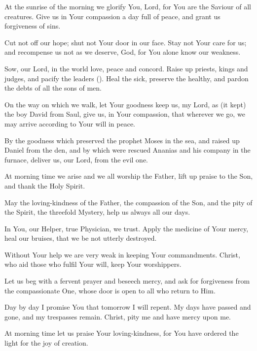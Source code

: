 \documentclass[12pt,twoside,a5paper]{article}
\begin{document}


\label{at-the-sunrise}


\begin{halfparskip}
  At the sunrise of the morning we glorify You, Lord, for You are the Saviour of all creatures. Give us in Your compassion a day full of peace, and grant us forgiveness of sins.

  Cut not off our hope; shut not Your door in our face. Stay not Your care for us; and recompense us not as we deserve, God, for You alone know our weakness.

  Sow, our Lord, in the world love, peace and concord. Raise up priests, kings and judges, and pacify the leaders (). Heal the sick, preserve the healthy, and pardon the debts of all the sons of men.

  On the way on which we walk, let Your goodness keep us, my Lord, as (it kept) the boy David from Saul, give us, in Your compassion, that wherever we go, we may arrive according to Your will in peace.

  By the goodness which preserved the prophet Moses in the sea, and raised up Daniel from the den, and by which were rescued Ananias and his company in the furnace, deliver us, our Lord, from the evil one.
\end{halfparskip}

\begin{halfparskip}
   At morning time we arise and we all worship the Father, lift up praise to the Son, and thank the Holy Spirit.

  May the loving-kindness of the Father, the compassion of the Son, and the pity of the Spirit, the threefold Mystery, help us always all our days.

  In You, our Helper, true Physician, we trust. Apply the medicine of Your mercy, heal our bruises, that we be not utterly destroyed.

  Without Your help we are very weak in keeping Your commandments. Christ, who aid those who fulfil Your will, keep Your worshippers.

  Let us beg with a fervent prayer and beseech mercy, and ask for forgiveness from the compassionate One, whose door is open to all who return to Him.

  Day by day I promise You that tomorrow I will repent. My days have passed and gone, and my trespasses remain. Christ, pity me and have mercy upon me.

  At morning time let us praise Your loving-kindness, for You have ordered the light for the joy of creation.
\end{halfparskip}
\end{document}

